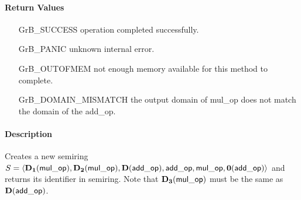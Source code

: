 \paragraph{Return Values}

\begin{itemize}[leftmargin=2.1in]
\item[{\sf GrB\_SUCCESS}]           operation completed successfully.
\item[{\sf GrB\_PANIC}]             unknown internal error.
\item[{\sf GrB\_OUTOFMEM}]          not enough memory available for this method to complete.
\item[{\sf GrB\_DOMAIN\_MISMATCH}]  the output domain of {\sf mul\_op} does not match the
                                    domain of the {\sf add\_op}.
\end{itemize}

\paragraph{Description}

Creates a new semiring $S = \langle \bold{D_1}({\sf mul\_op}), \bold{D_2}({\sf mul\_op}), 
\bold{D}({\sf add\_op}), {\sf add\_op}, {\sf mul\_op}, \bold{0}({\sf add\_op})\rangle$ and 
returns its identifier in {\sf semiring}.  Note that $\bold{D_3}({\sf mul\_op})$ must be
the same as $\bold{D}({\sf add\_op})$.

